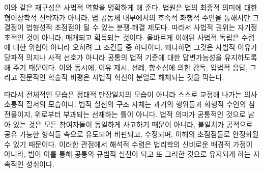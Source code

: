 \documentclass[12pt,a4paper]{article}
\begin{document}
이와 같은 재구성은 사법적 역할을 명확하게 해 준다. 법원은 법의 최종적
의미에 대한 형이상학적 신탁자가 아니라, 법 공동체 내부에서의 후속적
화행적 수인을 통해서만 그 결정이 법형성적 초점점이 될 수 있는 분쟁-해결
제도다. 따라서 사법적 권위는 자기정초적인 것이 아니라, 매개되고 획득되는
것이다. 올바르게 이해된 사법적 독립은 수렴에 대한 위협이 아니라 오히려
그 조건들 중 하나이다. 왜냐하면 그것은 사법적 이유가 당파적 의지나 사적
선호가 아니라 공통의 법적 기준에 대한 답변가능성을 유지하도록 해 주기
때문이다. 이와 동시에, 이유 제시, 선례, 항소심에 의한 감독, 입법적 응답,
그리고 전문적인 학술적 비평은 사법적 혁신이 분열로 해체되는 것을 막는다.

따라서 전체적인 모습은 정태적 만장일치의 모습이 아니라 스스로 교정해
나가는 의사소통적 질서의 모습이다. 법적 실천의 구조 자체는 과거의
행위들과 화행적 수인의 침전물이지, 위로부터 부과되는 선재하는 틀이
아니다. 법적 의미가 공통적인 것으로 남아 있는 것은 모든 참여자들이
동일하게 사고하기 때문이 아니라, 불일치가 공적으로 공유 가능한 형식들
속으로 유도되어 비판되고, 수정되며, 이해의 초점점들로 안정화될 수 있기
때문이다. 이러한 관점에서 해석적 수렴은 법리학의 신비로운 배경적 가정이
아니라, 법이 이를 통해 공통의 규범적 실천이 되고 또 그러한 것으로
유지되게 하는 지속적인 성취이다.

\clearpage

\printbibliography

\clearpage
\end{document}
